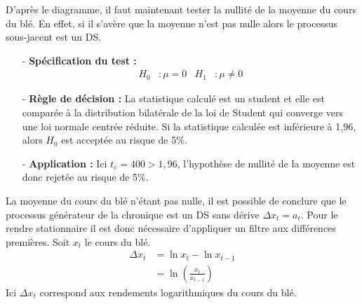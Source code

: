 %
D'après le diagramme, il faut maintenant tester la nullité de la moyenne du cours du blé. En effet, si il s'avère que la moyenne n'est pas nulle alors le processus 
sous-jacent est un DS.
\begin{itemize}
    \item[-]\textbf{Spécification du test :}
\begin{align*}
    H_{0} &: \mu = 0 & H_{1} &: \mu \neq 0
\end{align*}
\item[-]\textbf{Règle de décision :} La statistique calculé est un student et elle est comparée à la distribution bilatérale de la loi de Student qui converge vers une loi normale centrée réduite. Si la statistique calculée est inférieure à 1,96, alors $H_{0}$ est acceptée au risque de 5\%.
\item[-]\textbf{Application :} Ici $t_{c} = 400 > 1,96$, l'hypothèse de nullité de la moyenne est donc rejetée au risque de 5\%.
\end{itemize}
La moyenne du cours du blé n'étant pas nulle, il est possible de conclure que le processus générateur de la chronique est un DS sans dérive $\Delta x_{t} = a_{t}$. Pour le 
rendre stationnaire il est donc nécessaire d'appliquer un filtre aux différences premières. Soit $x_{t}$ le cours du blé.
\begin{equation*}
    \begin{split}
        \Delta x_{t} &= \ln x_{t} - \ln x_{t-1} \\
        &= \ln\left(\frac{x_{t}}{x_{t-1}}\right)
    \end{split}
\end{equation*}
Ici $\Delta x_{t}$ correspond aux rendements logarithmiques du cours du blé.
